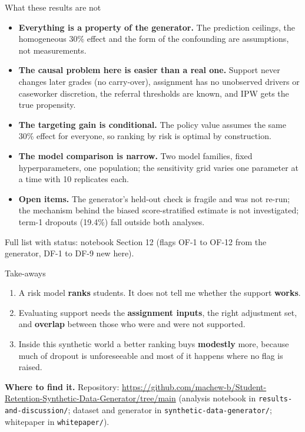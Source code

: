 \documentclass[aspectratio=169,11pt]{beamer}
\newcommand{\key}[1]{\textcolor{paperblue}{\textbf{#1}}}
\begin{document}
\begin{frame}{What these results are not}
\begin{itemize}\setlength\itemsep{2.5pt}
\item \key{Everything is a property of the generator.} The prediction ceilings, the homogeneous 30\% effect and the form of the confounding are assumptions, not measurements.
\item \key{The causal problem here is easier than a real one.} Support never changes later grades (no carry-over), assignment has no unobserved drivers or caseworker discretion, the referral thresholds are known, and IPW gets the true propensity.
\item \key{The targeting gain is conditional.} The policy value assumes the same 30\% effect for everyone, so ranking by risk is optimal by construction.
\item \key{The model comparison is narrow.} Two model families, fixed hyperparameters, one population; the sensitivity grid varies one parameter at a time with 10 replicates each.
\item \key{Open items.} The generator's held-out check is fragile and was not re-run; the mechanism behind the biased score-stratified estimate is not investigated; term-1 dropouts (19.4\%) fall outside both analyses.
\end{itemize}
\vspace{1mm}
{\scriptsize Full list with status: notebook Section 12 (flags OF-1 to OF-12 from the generator, DF-1 to DF-9 new here).}
\end{frame}

\begin{frame}{Take-aways}
\begin{tcolorbox}[colback=titlebox,colframe=paperblue!40,boxrule=0.5pt,arc=2mm,left=4mm,right=4mm,top=3mm,bottom=3mm]
\begin{enumerate}\setlength\itemsep{5pt}
\item A risk model \key{ranks} students. It does not tell me whether the support \key{works}.
\item Evaluating support needs the \key{assignment inputs}, the right adjustment set, and \key{overlap} between those who were and were not supported.
\item Inside this synthetic world a better ranking buys \key{modestly} more, because much of dropout is unforeseeable and most of it happens where no flag is raised.
\end{enumerate}
\end{tcolorbox}
\vspace{2mm}
\small
\textbf{\sffamily Where to find it.} Repository: \url{https://github.com/machew-b/Student-Retention-Synthetic-Data-Generator/tree/main} (analysis notebook in \texttt{results-and-discussion/}; dataset and generator in \texttt{synthetic-data-generator/}; whitepaper in \texttt{whitepaper/}).
\end{frame}
\end{document}
